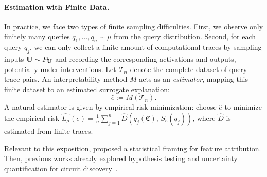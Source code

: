 \paragraph{Estimation with Finite Data.}
In practice, we face two types of finite sampling difficulties. First, we observe only finitely many queries $q_1,\ldots,q_n \sim \mu$ from the query distribution. Second, for each query $q_j$, we can only collect a finite amount of computational traces by sampling inputs $\mathbf{U} \sim P_{\mathbf{U}}$ and recording the corresponding activations and outputs, potentially under interventions.
% 
Let $\mathcal{T}_n$ denote the complete dataset of query-trace pairs. An interpretability method $M$ acts as an \emph{estimator}, mapping this finite dataset to an estimated surrogate explanation:
\begin{equation}
\hat{e} := M(\mathcal{T}_n).
\end{equation}
A natural estimator is given by empirical risk minimization: choose $\hat{e}$ to minimize the empirical risk $\widehat{L_\mu}(e) = \frac{1}{n}\sum_{j=1}^n \widehat{D}(q_j(\mathfrak{C}) ,\, S_e(q_j))$, where $\widehat{D}$ is estimated from finite traces.
% 

Relevant to this exposition, \citet{pmlr-v202-senetaire23a} proposed a statistical framing for feature attribution. Then, previous works already explored hypothesis testing and uncertainty quantification for circuit discovery~\citep{shi2024hypothesistestingcircuithypothesis,meloux2025mechanisticinterpretabilitystatisticalestimation}.



